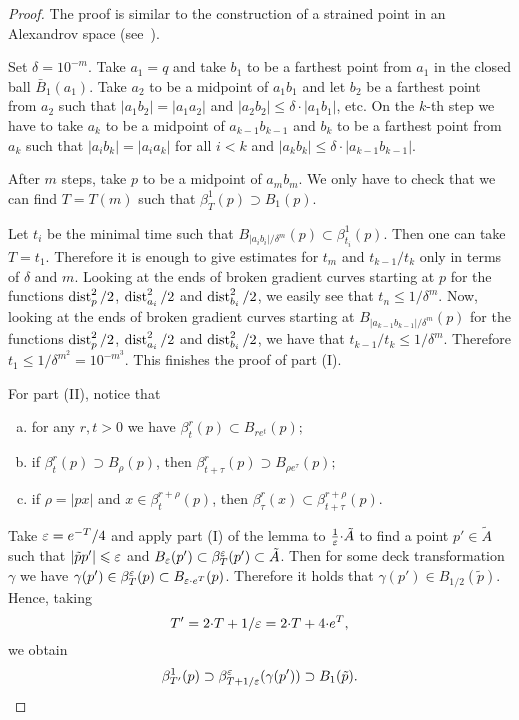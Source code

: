 \documentclass{amsart}
\begin{document}
\begin{proof}
The proof is similar to the construction of a strained point in an  Alexandrov space (see~\cite{BGP}).

Set $\delta=10^{-m}$.
Take $a_1=q$ and take $b_1$ to be a farthest point from $a_1$ in the closed ball $\bar B_1(a_1)$.
Take $a_2$ to be a midpoint of $a_1b_1$ and let  $b_2$ be
a farthest point from $a_2$
such that $|a_1b_2|=|a_1a_2|$ and $|a_2b_2|\le\delta{\cdot} |a_1b_1|$, etc.
On the $k$-th step we have to take $a_{k}$ to be a midpoint of
$a_{k-1}b_{k-1}$
and $b_{k}$
to be a farthest point from $a_{k}$
such that $|a_ib_{k}|=|a_ia_{k}|$ for all $i< k$  and
$|a_{k}b_{k}|\le\delta{\cdot}  |a_{k-1}b_{k-1}|$.

After $m$ steps, take $p$ to be a midpoint of $a_mb_m$.
We only have to check that we can find $T=T(m)$
such that $\beta^{1}_T(p)\supset B_1(p)$.

Let $t_i$ be the minimal time such that $B_{|a_ib_i|/\delta^m}(p)\subset \beta^{1}_{t_i}(p)$.
Then one can take $T=t_1$.
Therefore it is enough to give estimates for $t_m$ and $t_{k-1}/t_k$ only in terms of $\delta$ and $m$.
Looking at the ends of broken gradient curves
starting at $p$
for the functions $\operatorname{\rm dist}^2_{p}/2$, $\operatorname{\rm dist}^2_{a_i}/2$
and $ \operatorname{\rm dist}^2_{b_i}/2$, we easily see that $t_n\le 1/\delta^m$.
Now, looking
at the ends of broken gradient curves
starting at $ B_{|a_{k-1}b_{k-1}|/\delta^m}(p)$ for
the functions $\operatorname{\rm dist}^2_{p}/2$, $\operatorname{\rm dist}^2_{a_i}/2$
and $ \operatorname{\rm dist}^2_{b_i}/2$,
we have that $t_{k-1}/t_{k}\le 1/\delta^m$.
Therefore $t_1\le 1/\delta^{m^2}=10^{-m^3}$.
This finishes the proof of part (I).

For part (II),
notice that
\begin{enumerate}[a)]
\item for any $r,t>0$ we have
$\beta^r_t(p)\subset B_{re^t}(p);$
\item if $\beta^r_t(p)\supset B_{\rho}(p)$, then
$\beta^r_{t+\tau}(p)\supset B_{\rho e^\tau}(p);$
\item if $\rho=|px|$ and $x\in \beta^{r+\rho}_t(p)$,
then $\beta^{r}_\tau(x)\subset \beta^{r+\rho}_{t+\tau}(p)$.
\end{enumerate}
Take $\varepsilon=e^{-T}/4$ and apply part (I) of the lemma to $\frac1{\varepsilon}{\cdot} \tilde A$
to find a point $p'\in \tilde A$ such that $|\tilde pp'|\leqslant \varepsilon$
and $B_{\varepsilon}(p')\subset \beta^{\varepsilon}_{T}(p')\subset \tilde A$.
Then for some deck transformation $\gamma$
we have $\gamma(p')\in \beta^\varepsilon_T(p)\subset B_{\varepsilon{\cdot}  e^T}(p)$.
Therefore it holds that $\gamma(p')\in B_{1/2}(\tilde p)$.
Hence, taking
$$T'=2{\cdot} T+1/\varepsilon=2{\cdot} T+4{\cdot} e^{T},$$
we obtain
$$\beta^{1}_{T'}(p)\supset \beta^\varepsilon_{T+1/\varepsilon}(\gamma(p'))
\supset B_1(\tilde p).$$
\end{proof}
\end{document}
